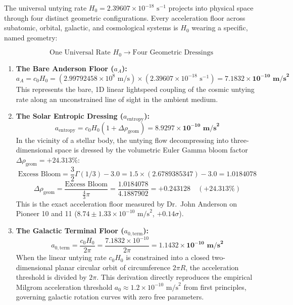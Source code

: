 \documentclass[11pt,a4paper]{article}
\begin{document}
The universal untying rate $H_0 = 2.39607 \times 10^{-18}\text{ s}^{-1}$ projects into physical space through four distinct geometric configurations. Every acceleration floor across subatomic, orbital, galactic, and cosmological systems is $H_0$ wearing a specific, named geometry:

\begin{equation}
\text{One Universal Rate } H_0 \longrightarrow \text{Four Geometric Dressings}
\end{equation}

\begin{enumerate}
    \item \textbf{The Bare Anderson Floor ($a_A$):}
    \begin{equation}
    a_A = c_0 H_0 = (2.99792458 \times 10^8\text{ m/s}) \times (2.39607 \times 10^{-18}\text{ s}^{-1}) = \mathbf{7.1832 \times 10^{-10}\text{ m/s}^2}
    \label{eq:bare_anderson_floor}
    \end{equation}
    This represents the bare, 1D linear lightspeed coupling of the cosmic untying rate along an unconstrained line of sight in the ambient medium.

    \item \textbf{The Solar Entropic Dressing ($a_{\text{entropy}}$):}
    \begin{equation}
    a_{\text{entropy}} = c_0 H_0 (1 + \Delta\rho_{\text{geom}}) = \mathbf{8.9297 \times 10^{-10}\text{ m/s}^2}
    \label{eq:solar_entropic_dressing}
    \end{equation}
    In the vicinity of a stellar body, the untying flow decompressing into three-dimensional space is dressed by the volumetric Euler Gamma bloom factor $\Delta\rho_{\text{geom}} = +24.313\%$:
    \begin{equation}
    \text{Excess Bloom} = \frac{3}{2} \Gamma(1/3) - 3.0 = 1.5 \times (2.6789385347) - 3.0 = 1.0184078
    \end{equation}
    \begin{equation}
    \Delta\rho_{\text{geom}} = \frac{\text{Excess Bloom}}{\frac{4}{3}\pi} = \frac{1.0184078}{4.1887902} = \mathbf{+0.243128} \quad (+24.313\%)
    \label{eq:drho_geom}
    \end{equation}
    This is the exact acceleration floor measured by Dr.~John Anderson on Pioneer 10 and 11 ($8.74 \pm 1.33 \times 10^{-10}\text{ m/s}^2$, $+0.14\sigma$).

    \item \textbf{The Galactic Terminal Floor ($a_{0,\text{term}}$):}
    \begin{equation}
    a_{0,\text{term}} = \frac{c_0 H_0}{2\pi} = \frac{7.1832 \times 10^{-10}}{2\pi} = \mathbf{1.1432 \times 10^{-10}\text{ m/s}^2}
    \label{eq:galactic_terminal_floor}
    \end{equation}
    When the linear untying rate $c_0 H_0$ is constrained into a closed two-dimensional planar circular orbit of circumference $2\pi R$, the acceleration threshold is divided by $2\pi$. This derivation directly reproduces the empirical Milgrom acceleration threshold $a_0 \approx 1.2 \times 10^{-10}\text{ m/s}^2$ from first principles, governing galactic rotation curves with zero free parameters.


\end{enumerate}
\end{document}

